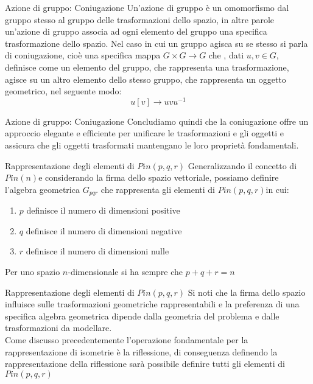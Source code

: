 \begin{frame}{Azione di gruppo: Coniugazione}
   Un’azione di gruppo è un omomorfismo dal gruppo stesso al gruppo delle trasformazioni dello spazio,
   in altre parole un’azione di gruppo associa ad ogni elemento del gruppo una specifica trasformazione dello spazio. 
   Nel caso in cui un gruppo agisca su se stesso si parla di coniugazione, cioè una specifica mappa \(G \times G\rightarrow G\) che , dati \(u, v \in G\), definisce come un elemento del gruppo, che rappresenta una trasformazione,  agisce su un altro elemento dello stesso gruppo, che rappresenta un oggetto geometrico,  nel seguente modo:
   \begin{equation}
      u[v]\rightarrow uvu^{-1}
   \end{equation}
\end{frame}

\begin{frame}{Azione di gruppo: Coniugazione}
   Concludiamo quindi che la coniugazione offre un approccio elegante e efficiente per unificare le trasformazioni e gli oggetti e assicura che gli oggetti trasformati mantengano le loro proprietà fondamentali. 
\end{frame}

\begin{frame}{Rappresentazione degli elementi di \(Pin(p,q,r)\)}
   Generalizzando il concetto di \(Pin(n)\)e considerando la firma dello spazio vettoriale, possiamo definire l’algebra geometrica \(G_{pqr}\)  che rappresenta gli elementi di  \(Pin(p,q,r)\)in cui:
   \begin{enumerate}
      \item \(p\) definisce il numero di dimensioni positive
      \item \(q\) definisce il numero di dimensioni negative
      \item \(r\) definisce il numero di dimensioni nulle
   \end{enumerate}
   Per uno spazio \(n\)-dimensionale si ha sempre che \(p+q+r = n\)
\end{frame}

\begin{frame}{Rappresentazione degli elementi di \(Pin(p,q,r)\)}
   Si noti che la firma dello spazio influisce sulle trasformazioni geometriche rappresentabili e la preferenza di una specifica algebra geometrica dipende dalla geometria del problema e dalle trasformazioni da modellare.\\
   Come discusso precedentemente l’operazione fondamentale per la rappresentazione di isometrie è la riflessione, di conseguenza definendo la rappresentazione della riflessione sarà possibile definire tutti gli elementi di \(Pin(p,q,r)\)
\end{frame}

